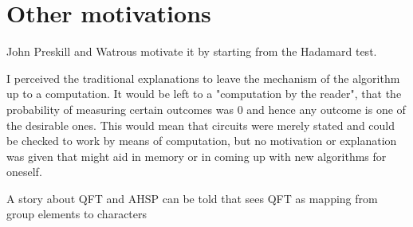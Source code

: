 \documentclass[12pt, a4paper]{article}
\begin{document}

	
	\section{Other motivations}
	
	John Preskill and Watrous motivate it by starting from the Hadamard test. 
	
	I perceived the traditional explanations to leave the mechanism of the algorithm up to a computation. It would be left to a "computation by the reader", that the probability of measuring certain outcomes was 0 and hence any outcome is one of the desirable ones. This would mean that circuits were merely stated and could be checked to work by means of computation, but no motivation or explanation was given that might aid in memory or in coming up with new algorithms for oneself. 
	
	
	A story about QFT and AHSP can be told that sees QFT as mapping from group elements to characters 

	
	
	

	
\end{document}
